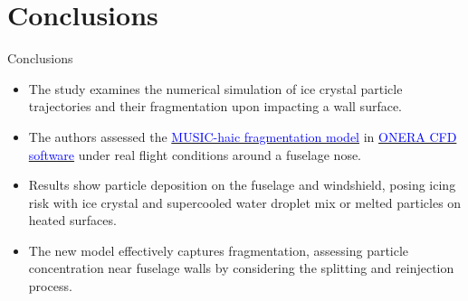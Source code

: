 \documentclass[aspectratio=169,xcolor=dvipsnames]{beamer}
\begin{document}
\section{Conclusions}

\begin{frame}{Conclusions}
   \begin{itemize}
       \item The study examines the numerical simulation of ice crystal particle trajectories and their fragmentation upon impacting a wall surface.
       \item The authors assessed the \href{https://www.music-haic.eu/page/en/media-center/available-documentation.php}{\textcolor{blue}{MUSIC-haic fragmentation model}} in \href{https://www.onera.fr/en/site-index/computational-fluid-dynamics.html}{\textcolor{blue}{ONERA CFD software}} under real flight conditions around a fuselage nose.
       \item Results show particle deposition on the fuselage and windshield, posing icing risk with ice crystal and supercooled water droplet mix or melted particles on heated surfaces.
       \item The new model effectively captures fragmentation, assessing particle concentration near fuselage walls by considering the splitting and reinjection process.
   \end{itemize}
\end{frame}
\end{document}
